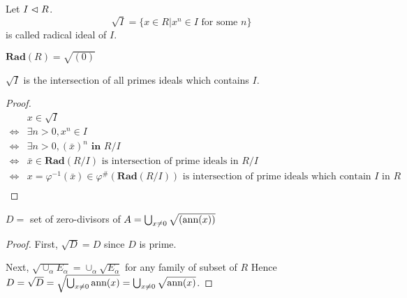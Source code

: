 \documentclass{amsart}
\begin{document}
\begin{secdefn}
	Let $I \vartriangleleft R$.
	\[
	\sqrt{I} = \big\{x \in R| x^n \in I \text{ for some } n \big\}
	\]
	is called radical ideal of $I$.
\end{secdefn}
\begin{rem}
	$\textbf{Rad}(R)= \sqrt{(0)}$
\end{rem}

\begin{secprop}
	$\sqrt{I}$ is the intersection of all primes ideals which contains $I$.
\end{secprop}
\begin{proof}
	\[
	\begin{aligned}
		 & x \in \sqrt{I}&\\
		 \Leftrightarrow& \exists n >0 , x^n \in I&\\
		 \Leftrightarrow& \exists n >0, (\bar{x})^{n} \textbf{ in } R/I&\\
		 \Leftrightarrow& \bar{x} \in \textbf{Rad}(R/I) \text{ is intersection of prime ideals in } R/I&\\
		 \Leftrightarrow& x= \varphi^{-1}(\bar{x}) \in \varphi^{\#}(\textbf{Rad}(R/I))\text{ is intersection of prime ideals which contain }I \text{ in } R&\\
	\end{aligned}
	\]
\end{proof}

\begin{secprop}
	$D=$ set of zero-divisors of $A= \bigcup_{x \neq 0} \sqrt{(\text{ann}(x))}$  
\end{secprop}
\begin{proof}
	First, $\sqrt{D} = D$ since $D$ is prime.
	
	Next, $\sqrt{\cup_{\alpha} E_\alpha} = \cup_{\alpha} \sqrt{E_\alpha}$ for any family of subset of $R$
	Hence $D= \sqrt{D} = \sqrt{\bigcup_{x \neq 0} \text{ann}(x)} = \bigcup_{x \neq 0} \sqrt{\text{ann}(x)}$.
\end{proof}
\end{document}
